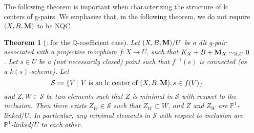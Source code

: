 \documentclass[11pt]{amsart}
\numberwithin{equation}{section}
\newcommand{\Mm}{{\bf{M}}}
\newcommand{\Qq}{\mathbb{Q}}
\newtheorem{thm}{Theorem}[subsection]
\theoremstyle{definition}
\theoremstyle{definition}
\theoremstyle{definition}
\begin{document}
The following theorem is important when characterizing the structure of lc centers of g-pairs. We emphasize that, in the following theorem, we do not require $(X,B,\Mm)$ to be NQC.

\begin{thm}[{\cite[Theorem 3.5]{Bir20}; \cite[Theorem 1.4]{FS23} for the $\Qq$-coefficient case}]\label{thm: P1 link for gdlt crepant log structure} 
Let $(X,B,\Mm)/U$ be a dlt g-pair associated with a projective morphism $f: X\rightarrow U$, such that $K_X+B+\Mm_X\sim_{\mathbb R,U}0$. Let $s\in U$ be a (not necessarily closed) point such that $f^{-1}(s)$ is connected (as a $k(s)$-scheme). Let
$$\mathcal{S}:=\{V\mid V\text{ is an lc center of }(X,B,\Mm), s\in f(V)\}$$
and $Z,W\in\mathcal{S}$ be two elements such that $Z$ is minimal in $\mathcal{S}$ with respect to the inclusion. Then there exists $Z_W\in\mathcal{S}$ such that $Z_W\subset W$, and $Z$ and $Z_W$ are $\mathbb P^1$-linked$/U$. In particular, any minimal elements in $\mathcal{S}$ with respect to inclusion are $\mathbb P^1$-linked$/U$ to each other.
\end{thm}
\end{document}
